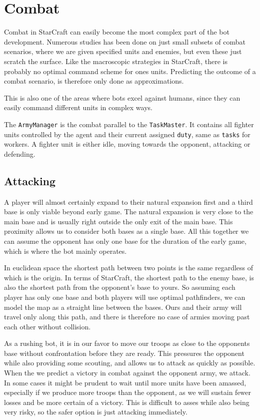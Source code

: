 \chapter{Combat}
Combat in StarCraft can easily become the most complex part of the bot development. Numerous studies has been done on just small subsets of combat scenarios, where we are given specified units and enemies, but even these just scratch the surface. Like the macroscopic strategies in StarCraft, there is probably no optimal command scheme for ones units. Predicting the outcome of a combat scenario, is therefore only done as approximations.

This is also one of the areas where bots excel against humans, since they can easily command different units in complex ways.

The \texttt{ArmyManager} is the combat parallel to the \texttt{TaskMaster}. It contains all fighter units controlled by the agent and their current assigned \texttt{duty}, same as \texttt{tasks} for workers. A fighter unit is either idle, moving towards the opponent, attacking or defending.

\section{Attacking}
A player will almost certainly expand to their natural expansion first and a third base is only viable beyond early game. The natural expansion is very close to the main base and is usually right outside the only exit of the main base. This proximity allows us to consider both bases as a single base. All this together we can assume the opponent has only one base for the duration of the early game, which is where the bot mainly operates.

In euclidean space the shortest path between two points is the same regardless of which is the origin. In terms of StarCraft, the shortest path to the enemy base, is also the shortest path from the opponent's base to yours. So assuming each player has only one base and both players will use optimal pathfinders, we can model the map as a straight line between the bases. Ours and their army will travel only along this path, and there is therefore no case of armies moving past each other without collision.

As a rushing bot, it is in our favor to move our troops as close to the opponents base without confrontation before they are ready. This pressures the opponent while also providing some scouting, and allows us to attack as quickly as possible. When the we predict a victory in combat against the opponent army, we attack. In some cases it might be prudent to wait until more units have been amassed, especially if we produce more troops than the opponent, as we will sustain fewer losses and be more certain of a victory. This is difficult to asses while also being very risky, so the safer option is just attacking immediately.

